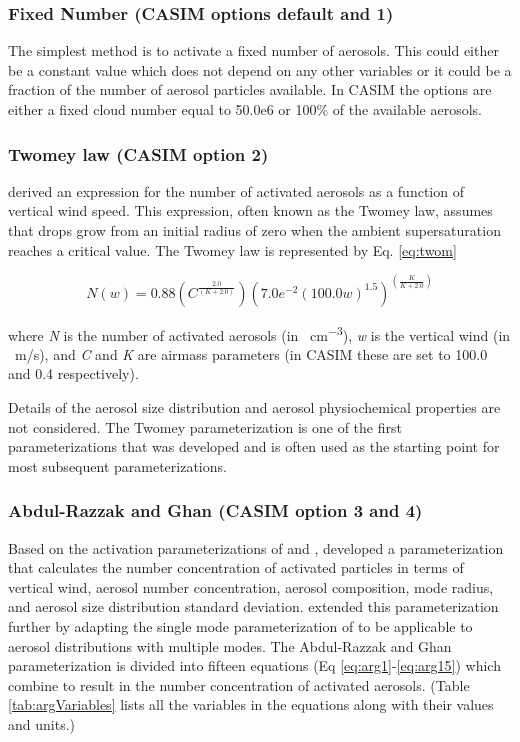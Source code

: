 \subsubsection{Fixed Number (CASIM options default and 1)}
The simplest method is to activate a fixed number of aerosols. This could either be a constant value which does not depend on any other variables or it could be a fraction of the number of aerosol particles available. In CASIM the options are either a fixed cloud number equal to 50.0e6 or 100\% of the available aerosols.

\subsubsection{Twomey law (CASIM option 2)}
\cite{twom1959} derived an expression for the number of activated aerosols as a function of vertical wind speed. This expression, often known as the Twomey law, assumes that drops grow from an initial radius of zero when the ambient supersaturation reaches a critical value. The Twomey law is represented by Eq. \ref{eq:twom}

\begin{equation} \label{eq:twom}
N(w) = 0.88 \left(C^{\frac{2.0}{(K+2.0)}}\right) \left(7.0e^{-2}(100.0w)^{1.5}\right)^{\left(\frac{K}{K+2.0}\right)}
\end{equation}  

where \textit{N} is the number of activated aerosols (in \SI{}{cm^{-3}}), \textit{w} is the vertical wind (in \SI{}{m/s}), and \textit{C} and \textit{K} are airmass parameters (in CASIM these are set to 100.0 and 0.4 respectively).

Details of the aerosol size distribution and aerosol physiochemical properties are not considered. The Twomey parameterization is one of the first parameterizations that was developed and is often used as the starting point for most subsequent parameterizations. \citep{twom1959, rog1989, arg1998, arg2000}

\subsubsection{Abdul-Razzak and Ghan (CASIM option 3 and 4)}
Based on the activation parameterizations of \cite{twom1959} and \cite{ghan1993}, \cite{arg1998} developed a parameterization that calculates the number concentration of activated particles in terms of vertical wind, aerosol number concentration, aerosol composition, mode radius, and aerosol size distribution standard deviation. \cite{arg2000} extended this parameterization further by adapting the single mode parameterization of \cite{arg1998} to be applicable to aerosol distributions with multiple modes. The Abdul-Razzak and Ghan parameterization is divided into fifteen equations (Eq \ref{eq:arg1}-\ref{eq:arg15}) which combine to result in the number concentration of activated aerosols. (Table \ref{tab:argVariables} lists all the variables in the equations along with their values and units.)

